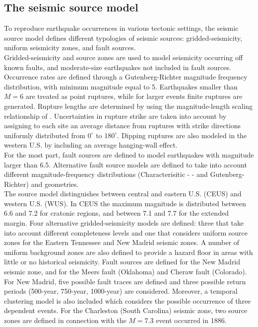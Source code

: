 \subsection{The seismic source model}
To reproduce earthquake occurrences in various tectonic settings, the seismic source model defines different typologies of seismic sources: gridded-seismicity, uniform seismicity zones, and fault sources. \\
Gridded-seismicity and source zones are used to model seismicity occurring off known faults, and moderate-size earthquakes not included in fault sources. Occurrence rates are defined through a Gutenberg-Richter magnitude frequency distribution, with minimum magnitude equal to 5. Earthquakes smaller than $M=6$ are treated as point ruptures, while for larger events finite ruptures are generated. Rupture lengths are determined by using the magnitude-length scaling relationship of \cite{wells1994}. Uncertainties in rupture strike are taken into account by assigning to each site an average distance from ruptures with strike directions uniformly distributed from $0^{\circ}$ to $180^{\circ}$. Dipping ruptures are also modeled in the western U.S. by including an average hanging-wall effect.\\
For the most part, fault sources are defined to model earthquakes with magnitude larger than 6.5. Alternative fault source models are defined to take into account different magnitude-frequency distributions (Characterisitic - \cite{schwartscoppersmith1984} - and Gutenberg-Richter) and geometries.\\
The source model distinguishes between central and eastern U.S. (CEUS) and western U.S. (WUS). In CEUS the maximum magnitude is distributed between 6.6 and 7.2 for cratonic regions, and between 7.1 and 7.7 for the extended margin. Four alternative gridded-seismicity models are defined: three that take into account different completeness levels and one that considers uniform source zones for the Eastern Tennessee and New Madrid seismic zones. A number of uniform background zones are also defined to provide a hazard floor in areas with little or no historical seismicity. Fault sources are defined for the New Madrid seismic zone, and for the Meers fault (Oklahoma) and Cheraw fault (Colorado). For New Madrid, five possible fault traces are defined and three possible return periods (500-year, 750-year, 1000-year) are considered. Moreover, a temporal clustering model is also included which considers the possible occurrence of three dependent events. For the Charleston (South Carolina) seismic zone, two source zones are defined in connection with the $M=7.3$ event occurred in 1886.\\
